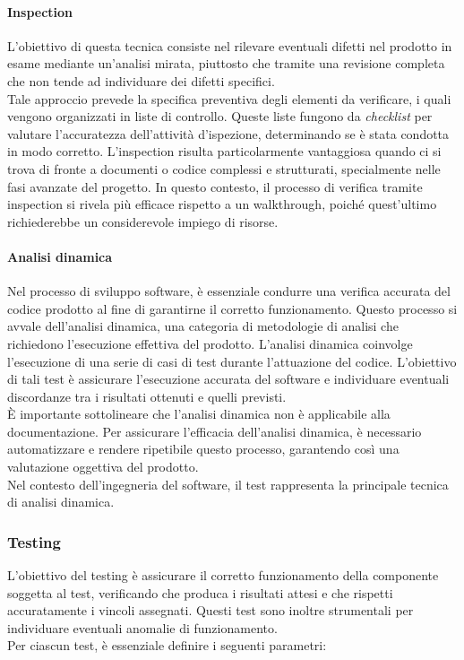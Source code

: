 \paragraph{Inspection}
L'obiettivo di questa tecnica consiste nel rilevare eventuali difetti nel prodotto in esame mediante un'analisi mirata, piuttosto che tramite una revisione completa che non tende ad individuare dei difetti specifici. \\
Tale approccio prevede la specifica preventiva degli elementi da verificare, i quali vengono organizzati in liste di controllo.
Queste liste fungono da \textit{checklist} per valutare l'accuratezza dell'attività d'ispezione, determinando se è stata condotta in modo corretto.
L'inspection risulta particolarmente vantaggiosa quando ci si trova di fronte a documenti o codice complessi e strutturati, specialmente nelle fasi avanzate del progetto. In questo contesto, il processo di verifica tramite inspection si rivela più efficace rispetto a un walkthrough, poiché quest'ultimo richiederebbe un considerevole impiego di risorse.

\paragraph{Analisi dinamica}
Nel processo di sviluppo software, è essenziale condurre una verifica accurata del codice prodotto al fine di garantirne il corretto funzionamento. Questo processo si avvale dell'analisi dinamica, una categoria di metodologie di analisi che richiedono l'esecuzione effettiva del prodotto.
L'analisi dinamica coinvolge l'esecuzione di una serie di casi di test durante l'attuazione del codice. L'obiettivo di tali test è assicurare l'esecuzione accurata del software e individuare eventuali discordanze tra i risultati ottenuti e quelli previsti. \\
È importante sottolineare che l'analisi dinamica non è applicabile alla documentazione.
Per assicurare l'efficacia dell'analisi dinamica, è necessario automatizzare e rendere ripetibile questo processo, garantendo così una valutazione oggettiva del prodotto. \\
Nel contesto dell'ingegneria del software, il test rappresenta la principale tecnica di analisi dinamica.

\subsubsection{Testing}
\label{subsubsec:Testing}
L'obiettivo del testing è assicurare il corretto funzionamento della componente soggetta al test, verificando che produca i risultati attesi e che rispetti accuratamente i vincoli assegnati. Questi test sono inoltre strumentali per individuare eventuali anomalie di funzionamento. \\
Per ciascun test, è essenziale definire i seguenti parametri:

